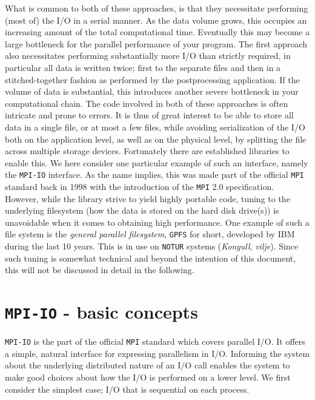 \documentclass[twoside, 11pt, a4paper]{article}
\begin{document}
What is common to both of these approaches, is that they necessitate performing (most
of) the I/O in a serial manner. As the data volume grows, this occupies an increasing amount
of the total computational time. Eventually this may become a large bottleneck for the 
parallel performance of your program. The first approach also necessitates performing
substantially more I/O than strictly required, in particular all data is written twice;
first to the separate files and then in a stitched-together fashion as performed by the 
postprocessing application. If the volume of data is substantial, this introduces another
severe bottleneck in your computational chain. The code involved in both of these
approaches is often intricate and prone to errors.
\newpage
It is thus of great interest to be able to store all data in a single file, or at most a 
few files, while avoiding serialization of the I/O both on the application level,
as well as on the physical level, by splitting the file across multiple storage devices. 
Fortunately there are established libraries to enable this. We here consider one
particular example of such an interface, namely the \texttt{MPI-IO} interface. 
As the name implies, this was made part of the official \texttt{MPI} standard back 
in 1998 with the introduction of the \texttt{MPI} 2.0 specification. However, while 
the library strive to yield highly portable code, tuning to the underlying filesystem
(how the data is stored on the hard disk drive(s)) is unavoidable when it comes to 
obtaining high performance. One example of such a file system is the \emph{general parallel 
filesystem}, \texttt{GPFS} for short, developed by IBM 
during the last 10 years. This is in use on \texttt{NOTUR} systems (\emph{Kongull}, \emph{vilje}). Since such tuning is somewhat 
technical and beyond the intention of this document, this will not be discussed in 
detail in the following.

\section{\texttt{MPI-IO} - basic concepts}
\texttt{MPI-IO} is the part of the official \texttt{MPI} standard which covers parallel I/O.
It offers a simple, natural interface for expressing parallelism in I/O. Informing
the system about the underlying distributed nature of an I/O call enables the system
to make good choices about how the I/O is performed on a lower level. 
We first consider the simplest case; I/O that is sequential on each process.
\end{document}
